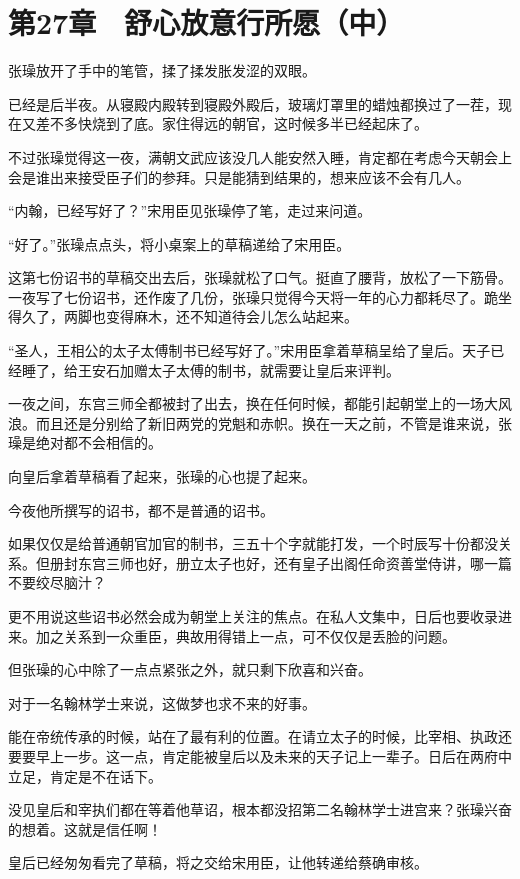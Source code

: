 \section{第27章　舒心放意行所愿（中）}

张璪放开了手中的笔管，揉了揉发胀发涩的双眼。

已经是后半夜。从寝殿内殿转到寝殿外殿后，玻璃灯罩里的蜡烛都换过了一茬，现在又差不多快烧到了底。家住得远的朝官，这时候多半已经起床了。

不过张璪觉得这一夜，满朝文武应该没几人能安然入睡，肯定都在考虑今天朝会上会是谁出来接受臣子们的参拜。只是能猜到结果的，想来应该不会有几人。

“内翰，已经写好了？”宋用臣见张璪停了笔，走过来问道。

“好了。”张璪点点头，将小桌案上的草稿递给了宋用臣。

这第七份诏书的草稿交出去后，张璪就松了口气。挺直了腰背，放松了一下筋骨。一夜写了七份诏书，还作废了几份，张璪只觉得今天将一年的心力都耗尽了。跪坐得久了，两脚也变得麻木，还不知道待会儿怎么站起来。

“圣人，王相公的太子太傅制书已经写好了。”宋用臣拿着草稿呈给了皇后。天子已经睡了，给王安石加赠太子太傅的制书，就需要让皇后来评判。

一夜之间，东宫三师全都被封了出去，换在任何时候，都能引起朝堂上的一场大风浪。而且还是分别给了新旧两党的党魁和赤帜。换在一天之前，不管是谁来说，张璪是绝对都不会相信的。

向皇后拿着草稿看了起来，张璪的心也提了起来。

今夜他所撰写的诏书，都不是普通的诏书。

如果仅仅是给普通朝官加官的制书，三五十个字就能打发，一个时辰写十份都没关系。但册封东宫三师也好，册立太子也好，还有皇子出阁任命资善堂侍讲，哪一篇不要绞尽脑汁？

更不用说这些诏书必然会成为朝堂上关注的焦点。在私人文集中，日后也要收录进来。加之关系到一众重臣，典故用得错上一点，可不仅仅是丢脸的问题。

但张璪的心中除了一点点紧张之外，就只剩下欣喜和兴奋。

对于一名翰林学士来说，这做梦也求不来的好事。

能在帝统传承的时候，站在了最有利的位置。在请立太子的时候，比宰相、执政还要要早上一步。这一点，肯定能被皇后以及未来的天子记上一辈子。日后在两府中立足，肯定是不在话下。

没见皇后和宰执们都在等着他草诏，根本都没招第二名翰林学士进宫来？张璪兴奋的想着。这就是信任啊！

皇后已经匆匆看完了草稿，将之交给宋用臣，让他转递给蔡确审核。

